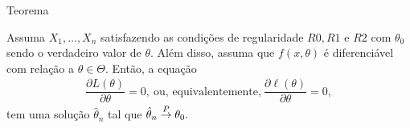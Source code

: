 \documentclass[12pt]{beamer}
\begin{document}


\begin{frame}{Teorema}
\begin{Teorema}\label{Teo3}
\justifying
Assuma $X_{1},\ldots,X_{n}$ satisfazendo as condições de regularidade $R0, R1$ e $R2$ com $\theta_{0}$ sendo o verdadeiro valor de $\theta.$ Além disso, assuma que $f(x,\theta)$ é diferenciável com relação a $\theta\in\Theta.$ Então, a equação 
\begin{align*}
    \dfrac{\partial L(\theta)}{\partial\theta}=0,~\text{ou, equivalentemente,}~\dfrac{\partial\ell(\theta)}{\partial\theta}=0,
\end{align*}
tem uma solução $\hat{\theta}_{n}$ tal que $\hat{\theta}_{n}\overset{P}{\rightarrow} \theta_{0}.$
\end{Teorema}
\end{frame}
\end{document}
